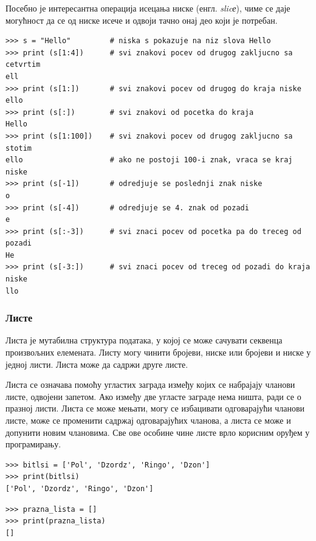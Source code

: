 Посебно је интересантна операција исецања ниске (енгл. \emph{slicе}), чиме се даје могућност да се од ниске исече и одвоји тачно онај део који је потребан.

\begin{lstlisting}[caption = Исецање ниске, label = slice]
>>> s = "Hello"         # niska s pokazuje na niz slova Hello
>>> print (s[1:4])      # svi znakovi pocev od drugog zakljucno sa cetvrtim
ell
>>> print (s[1:])       # svi znakovi pocev od drugog do kraja niske
ello
>>> print (s[:])        # svi znakovi od pocetka do kraja
Hello
>>> print (s[1:100])    # svi znakovi pocev od drugog zakljucno sa stotim
ello                    # ako ne postoji 100-i znak, vraca se kraj niske
>>> print (s[-1])       # odredjuje se poslednji znak niske
o
>>> print (s[-4])       # odredjuje se 4. znak od pozadi
e
>>> print (s[:-3])      # svi znaci pocev od pocetka pa do treceg od pozadi
He
>>> print (s[-3:])      # svi znaci pocev od treceg od pozadi do kraja niske
llo

\end{lstlisting}

\subsubsection{Листе}

Листа је мутабилна структура података, у којој се може сачувати секвенца произвољних елемената. Листу могу чинити бројеви, ниске или бројеви и ниске у једној листи. Листа може да садржи друге листе.

Листа се означава помоћу угластих заграда између којих се набрајају чланови листе, одвојени запетом. Ако између две угласте заграде нема ништа, ради се о празној листи. Листа се може мењати, могу се избацивати одговарајући чланови листе, може се променити садржај одговарајућих чланова, а листа се може и допунити новим члановима. Све ове особине чине листе врло корисним оруђем у програмирању.

\begin{lstlisting}[caption = Креирање листе, label = lista]
>>> bitlsi = ['Pol', 'Dzordz', 'Ringo', 'Dzon']
>>> print(bitlsi)
['Pol', 'Dzordz', 'Ringo', 'Dzon']
\end{lstlisting}

\begin{lstlisting}[caption = Креирање празне листе, label = prazna_lista]
>>> prazna_lista = []
>>> print(prazna_lista)
[]
\end{lstlisting}

